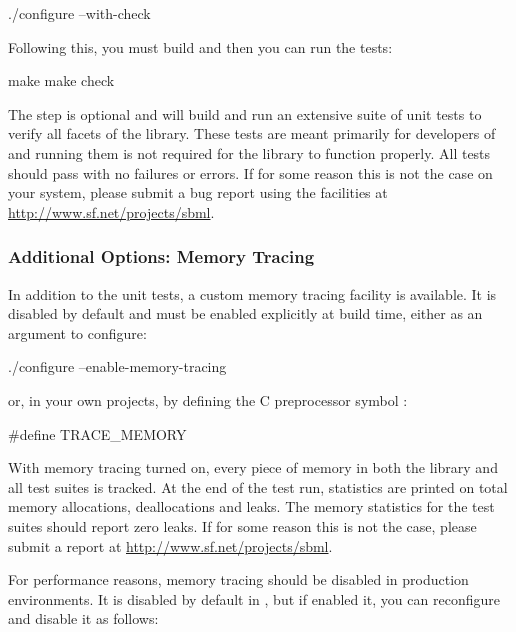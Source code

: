 \documentclass{sbmlmanual}
\begin{document}
\begin{shellVerbatim}
  ./configure --with-check
\end{shellVerbatim}

Following this, you must build \libsbml{} and then you can run the tests:

\begin{shellVerbatim}
  make
  make check
\end{shellVerbatim}

The  step is optional and will build and run an extensive
suite of unit tests to verify all facets of the library.  These tests are
meant primarily for developers of \libsbml{} and running them is not
required for the library to function properly.  All tests should pass with
no failures or errors.  If for some reason this is not the case on your
system, please submit a bug report using the facilities at
\url{http://www.sf.net/projects/sbml}.


\subsubsection{Additional Options: Memory Tracing}

In addition to the unit tests, a custom memory tracing facility is
available.  It is disabled by default and must be enabled explicitly
at build time, either as an argument to configure:

\begin{shellVerbatim}
  ./configure --enable-memory-tracing
\end{shellVerbatim}

or, in your own projects, by defining the C preprocessor symbol
:

\begin{cVerbatim}
  #define TRACE_MEMORY
\end{cVerbatim}

With memory tracing turned on, every piece of memory in both the library
and all test suites is tracked.  At the end of the test run, statistics are
printed on total memory allocations, deallocations and leaks.  The memory
statistics for the test suites should report zero leaks.  If for some
reason this is not the case, please submit a report at
\url{http://www.sf.net/projects/sbml}.

For performance reasons, memory tracing should be disabled in production
environments.  It is disabled by default in \libsbml{}, but if enabled it,
you can reconfigure and disable it as follows:
\end{document}
